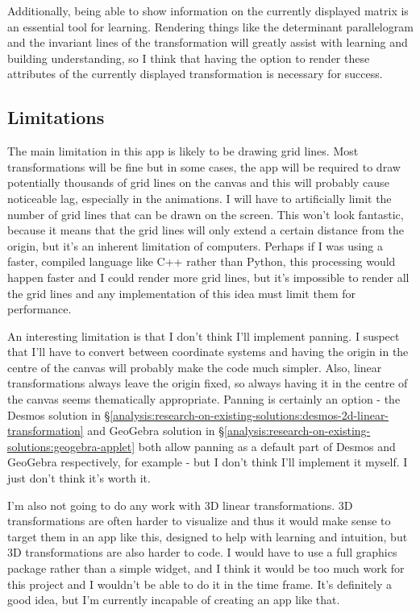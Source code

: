 \documentclass[../main.tex]{subfiles}
\begin{document}
Additionally, being able to show information on the currently displayed matrix is an essential tool for learning. Rendering things like the determinant parallelogram and the invariant lines of the transformation will greatly assist with learning and building understanding, so I think that having the option to render these attributes of the currently displayed transformation is necessary for success.

\subsection{Limitations\label{analysis:limitations}}

The main limitation in this app is likely to be drawing grid lines. Most transformations will be fine but in some cases, the app will be required to draw potentially thousands of grid lines on the canvas and this will probably cause noticeable lag, especially in the animations. I will have to artificially limit the number of grid lines that can be drawn on the screen. This won't look fantastic, because it means that the grid lines will only extend a certain distance from the origin, but it's an inherent limitation of computers. Perhaps if I was using a faster, compiled language like C++ rather than Python, this processing would happen faster and I could render more grid lines, but it's impossible to render all the grid lines and any implementation of this idea must limit them for performance.

An interesting limitation is that I don't think I'll implement panning. I suspect that I'll have to convert between coordinate systems and having the origin in the centre of the canvas will probably make the code much simpler. Also, linear transformations always leave the origin fixed, so always having it in the centre of the canvas seems thematically appropriate. Panning is certainly an option - the Desmos solution in \S\ref{analysis:research-on-existing-solutions:desmos-2d-linear-transformation} and GeoGebra solution in \S\ref{analysis:research-on-existing-solutions:geogebra-applet} both allow panning as a default part of Desmos and GeoGebra respectively, for example - but I don't think I'll implement it myself. I just don't think it's worth it.

I'm also not going to do any work with 3D linear transformations. 3D transformations are often harder to visualize and thus it would make sense to target them in an app like this, designed to help with learning and intuition, but 3D transformations are also harder to code. I would have to use a full graphics package rather than a simple widget, and I think it would be too much work for this project and I wouldn't be able to do it in the time frame. It's definitely a good idea, but I'm currently incapable of creating an app like that.
\end{document}
